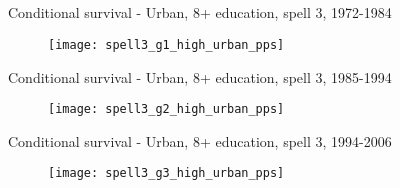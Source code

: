\documentclass[red]{beamer}
\begin{document}
\subsection{}


\begin{frame}{Conditional survival - Urban, 8+ education, spell 3, 1972-1984}

\begin{center}
\begin{figure}
\texttt{[image: spell3\_g1\_high\_urban\_pps]}
\end{figure}
\end{center}
\end{frame}


\begin{frame}{Conditional survival - Urban, 8+ education, spell 3, 1985-1994}

\begin{center}
\begin{figure}
\texttt{[image: spell3\_g2\_high\_urban\_pps]}
\end{figure}
\end{center}
\end{frame}


\begin{frame}{Conditional survival - Urban, 8+ education, spell 3, 1994-2006}

\begin{center}
\begin{figure}
\texttt{[image: spell3\_g3\_high\_urban\_pps]}
\end{figure}
\end{center}
\end{frame}



\end{document}
